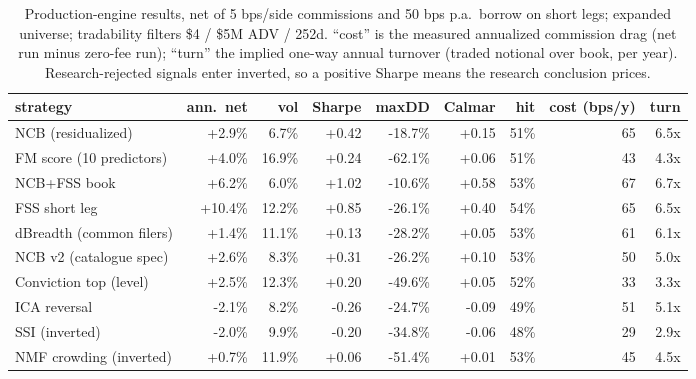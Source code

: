 \begin{table}[t]
\centering\footnotesize
\caption{Production-engine results, net of 5 bps/side commissions and 50 bps p.a.\ borrow on short legs; expanded universe; tradability filters \$4 / \$5M ADV / 252d. ``cost'' is the measured annualized commission drag (net run minus zero-fee run); ``turn'' the implied one-way annual turnover (traded notional over book, per year). Research-rejected signals enter inverted, so a positive Sharpe means the research conclusion prices.}
\label{tab:engine}
\begin{tabular}{lrrrrrrrr}
\toprule
strategy & ann.\ net & vol & Sharpe & maxDD & Calmar & hit & cost (bps/y) & turn \\
\midrule
NCB (residualized) & +2.9\% & 6.7\% & +0.42 & -18.7\% & +0.15 & 51\% & 65 & 6.5x \\
FM score (10 predictors) & +4.0\% & 16.9\% & +0.24 & -62.1\% & +0.06 & 51\% & 43 & 4.3x \\
NCB+FSS book & +6.2\% & 6.0\% & +1.02 & -10.6\% & +0.58 & 53\% & 67 & 6.7x \\
FSS short leg & +10.4\% & 12.2\% & +0.85 & -26.1\% & +0.40 & 54\% & 65 & 6.5x \\
dBreadth (common filers) & +1.4\% & 11.1\% & +0.13 & -28.2\% & +0.05 & 53\% & 61 & 6.1x \\
NCB v2 (catalogue spec) & +2.6\% & 8.3\% & +0.31 & -26.2\% & +0.10 & 53\% & 50 & 5.0x \\
Conviction top (level) & +2.5\% & 12.3\% & +0.20 & -49.6\% & +0.05 & 52\% & 33 & 3.3x \\
ICA reversal & -2.1\% & 8.2\% & -0.26 & -24.7\% & -0.09 & 49\% & 51 & 5.1x \\
SSI (inverted) & -2.0\% & 9.9\% & -0.20 & -34.8\% & -0.06 & 48\% & 29 & 2.9x \\
NMF crowding (inverted) & +0.7\% & 11.9\% & +0.06 & -51.4\% & +0.01 & 53\% & 45 & 4.5x \\
\bottomrule
\end{tabular}
\end{table}
